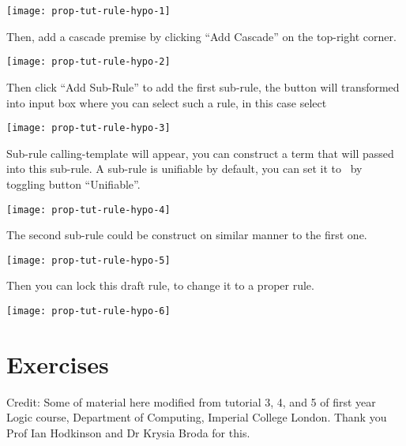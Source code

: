 \documentclass[master.tex]{subfiles}
\begin{document}
\begin{center}
  \texttt{[image: prop-tut-rule-hypo-1]}
\end{center}

Then, add a cascade premise by clicking ``Add Cascade'' on the top-right corner.

\begin{center}
  \texttt{[image: prop-tut-rule-hypo-2]}
\end{center}

Then click ``Add Sub-Rule'' to add the first sub-rule, the button will
transformed into input box where you can select such a rule, in this case select

\begin{center}
  \texttt{[image: prop-tut-rule-hypo-3]}
\end{center}

Sub-rule calling-template will appear, you can construct a term that will passed
into this sub-rule. A sub-rule is unifiable by default, you can set it to
\kExactMatch\ by toggling button ``Unifiable''.

\begin{center}
  \texttt{[image: prop-tut-rule-hypo-4]}
\end{center}

The second sub-rule could be construct on similar manner to the first one.

\begin{center}
  \texttt{[image: prop-tut-rule-hypo-5]}
\end{center}

Then you can lock this draft rule, to change it to a proper rule.

\begin{center}
  \texttt{[image: prop-tut-rule-hypo-6]}
\end{center}

\newpage

\section{Exercises}

Credit: Some of material here modified from tutorial 3, 4, and 5 of first year Logic
course, Department of Computing, Imperial College London. Thank you Prof Ian
Hodkinson and Dr Krysia Broda for this.
\end{document}
